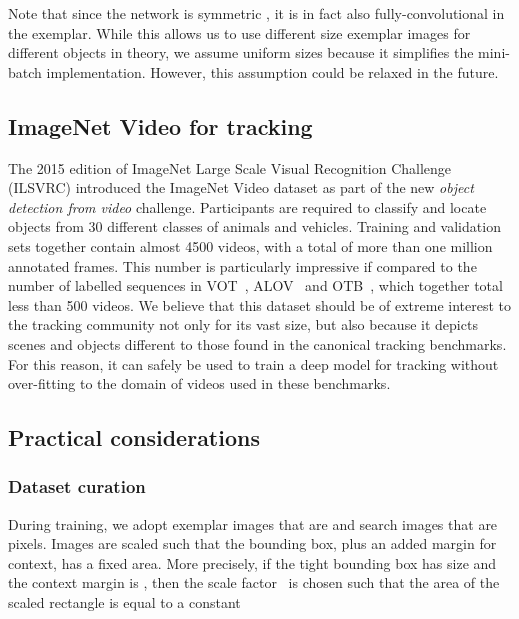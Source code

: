 Note that since the network is symmetric , it is in fact also fully-convolutional in the exemplar.
While this allows us to use different size exemplar images for different objects in theory, we assume uniform sizes because it simplifies the mini-batch implementation.
However, this assumption could be relaxed in the future.

\subsection{ImageNet Video for tracking}

The 2015 edition of ImageNet Large Scale Visual Recognition Challenge~\cite{ILSVRC15} (ILSVRC) introduced the ImageNet Video dataset as part of the new \emph{object detection from video} challenge.
Participants are required to classify and locate objects from 30 different classes of animals and vehicles.
Training and validation sets together contain almost 4500 videos, with a total of more than one million annotated frames.
This number is particularly impressive if compared to the number of labelled sequences in VOT~\cite{kristan2015visual}, ALOV~\cite{smeulders2014visual} and OTB~\cite{WuLimYang13}, which together total less than 500 videos.
We believe that this dataset should be of extreme interest to the tracking community not only for its vast size, but also because it depicts scenes and objects different to those found in the canonical tracking benchmarks.
For this reason, it can safely be used to train a deep model for tracking without over-fitting to the domain of videos used in these benchmarks.



\subsection{Practical considerations}
\label{sec:considerations}



\subsubsection{Dataset curation}
During training, we adopt exemplar images that are  and search images that are  pixels.
Images are scaled such that the bounding box, plus an added margin for context, has a fixed area.
More precisely, if the tight bounding box has size  and the context margin is , then the scale factor~ is chosen such that the area of the scaled rectangle is equal to a constant

